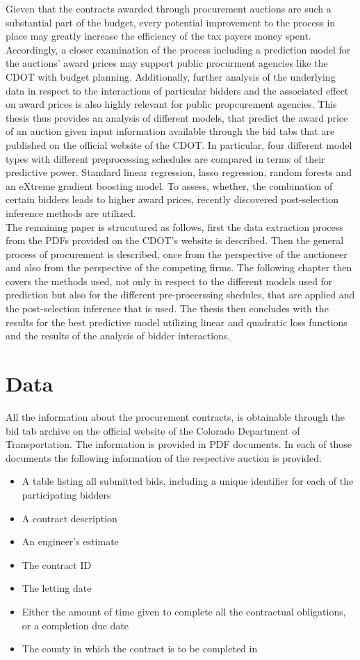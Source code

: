 \documentclass[a4paper,12pt, headsepline]{scrartcl}
\numberwithin{equation}{section}
\begin{document}
Gieven that the contracts awarded through procurement auctions are such a substantial part of the budget, every potential improvement to the process in place may greatly increase the efficiency of the tax payers money spent. Accordingly, a closer examination of the process including a prediction model for the auctions' award prices may support public procurment agencies like the CDOT with budget planning. Additionally, further analysis of the underlying data in respect to the interactions of particular bidders and the associated effect on award prices is also highly relevant for public propcurement agencies. This thesis thus provides an analysis of different models, that predict the award price of an auction given input information available through the bid tabs that are published on the official website of the CDOT. In particular, four different model types with different preprocessing schedules are compared in terms of their predictive power. Standard linear regression, lasso regression, random forests and an eXtreme gradient boosting model. To assess, whether, the combination of certain bidders leads to higher award prices, recently discovered post-selection inference methods are utilized.\\
The remaining paper is strucutured as follows, first the data extraction process from the PDFs provided on the CDOT's website is described. Then the general process of procurement is described, once from the perspective of the auctioneer and also from the perspective of the competing firms. The following chapter then covers the methods used, not only in respect to the different models used for prediction but also for the different pre-procerssing shedules, that are applied and the post-selection inference that is used. The thesis then concludes with the results for the best predictive model utilizing linear and quadratic loss functions and the results of the analysis of bidder interactions.

\section{Data}\label{sec:data}

All the information about the procurement contracts, is obtainable through the bid tab archive on the official website of the Colorado Department of Transportation. The information is provided in PDF documents. In each of those documents the following information of the respective auction is provided.

\begin{itemize}
	\item A table listing all submitted bids, including a unique identifier for each of the participating bidders
	\item A contract description
	\item An engineer's estimate
	\item The contract ID
	\item The letting date
	\item Either the amount of time given to complete all the contractual obligations, or a completion due date
	\item The county in which the contract is to be completed in 
\end{itemize}
\end{document}
